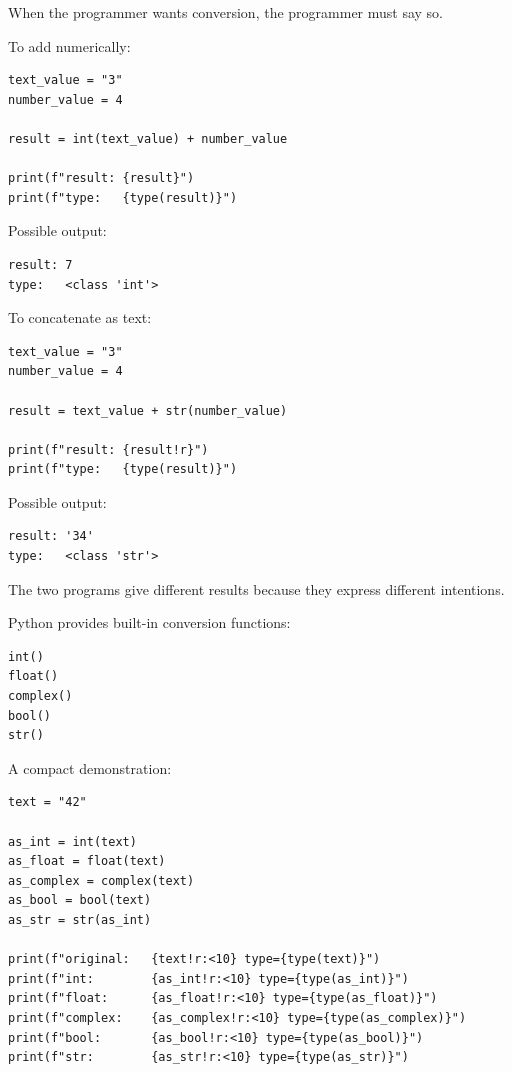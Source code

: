 When the programmer wants conversion, the programmer must say so.

To add numerically:

\begin{verbatim}
text_value = "3"
number_value = 4

result = int(text_value) + number_value

print(f"result: {result}")
print(f"type:   {type(result)}")
\end{verbatim}

Possible output:

\begin{verbatim}
result: 7
type:   <class 'int'>
\end{verbatim}

To concatenate as text:

\begin{verbatim}
text_value = "3"
number_value = 4

result = text_value + str(number_value)

print(f"result: {result!r}")
print(f"type:   {type(result)}")
\end{verbatim}

Possible output:

\begin{verbatim}
result: '34'
type:   <class 'str'>
\end{verbatim}

The two programs give different results because they express different intentions.

Python provides built-in conversion functions:

\begin{verbatim}
int()
float()
complex()
bool()
str()
\end{verbatim}

A compact demonstration:

\begin{verbatim}
text = "42"

as_int = int(text)
as_float = float(text)
as_complex = complex(text)
as_bool = bool(text)
as_str = str(as_int)

print(f"original:   {text!r:<10} type={type(text)}")
print(f"int:        {as_int!r:<10} type={type(as_int)}")
print(f"float:      {as_float!r:<10} type={type(as_float)}")
print(f"complex:    {as_complex!r:<10} type={type(as_complex)}")
print(f"bool:       {as_bool!r:<10} type={type(as_bool)}")
print(f"str:        {as_str!r:<10} type={type(as_str)}")
\end{verbatim}

